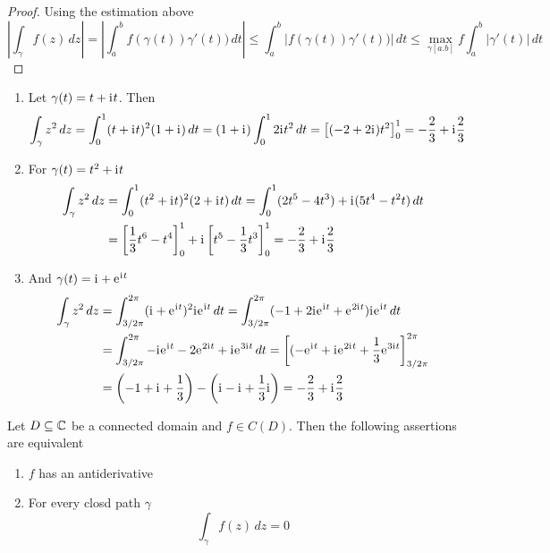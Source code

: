 \begin{definition}
\begin{proof} Using the estimation above
	\[
		\left| \int_{\gamma} f(z)\,dz \right|
			  = \left| \int_a^b f(\gamma(t))\gamma'(t))\,dt \right|
			  \le \int_a^b |f(\gamma(t))\gamma'(t))|\,dt 
			  \le  \max_{\gamma[a.b]}f \int_a^b |\gamma'(t)|\,dt 
	\]
\end{proof}
\bigskip


\begin{examples}\hfill
    \begin{enumerate}
        \item Let \( \gamma(t) = t + \mathrm{i}\mkern1mu t \). Then
			\[
				\int_{\gamma} z^2\,dz
					= \int_0^1 (t + \mathrm{i}\mkern1mu t)^2(1 + \mathrm{i}\mkern1mu)\,dt
					= (1 + \mathrm{i}\mkern1mu)\int_0^1 2\mathrm{i}\mkern1mu t^2\,dt 
					= \left[ (-2 + 2\mathrm{i}\mkern1mu) t^2 \right]_0^1 
					= -\frac{2}{3} + \mathrm{i}\mkern1mu \frac{2}{3}
			\]
		\item For \( \gamma(t) = t^2 + \mathrm{i}\mkern1mu t \) 
			\[
				\begin{split}
					\int_\gamma z^2\,dz
						& = \int_0^1 (t^2 + \mathrm{i}\mkern1mu t)^2(2 + \mathrm{i}\mkern1mu t)\,dt
							= \int_0^1 (2t^5 -  4t^3) + \mathrm{i}\mkern1mu(5t^4 - t^2t)\,dt \\
						& = \left[ \frac{1}{3} t^6 - t^4 \right]_0^1 + 
								\mathrm{i}\mkern1mu\left[ t^5 - \frac{1}{3}t^3 \right]_0^1
						  = -\frac{2}{3} + \mathrm{i}\mkern1mu \frac{2}{3}
				\end{split}
			\]
		\item And \( \gamma(t) = \mathrm{i}\mkern1mu + \mathrm{e}\mkern1mu^{\mathrm{i}\mkern1mu t} \)
			\[
				\begin{split}
					\int_\gamma z^2\,dz
						& = \int_{3/2\pi}^{2\pi} (\mathrm{i}\mkern1mu + \mathrm{e}\mkern1mu^{\mathrm{i}\mkern1mu t})^2\mathrm{i}\mkern1mu\mathrm{e}\mkern1mu^{\mathrm{i}\mkern1mu t}\,dt
							= \int_{3/2\pi}^{2\pi} (-1 + 2\mathrm{i}\mkern1mu\mathrm{e}\mkern1mu^{\mathrm{i}\mkern1mu t} + \mathrm{e}\mkern1mu^{2\mathrm{i}\mkern1mu t})\mathrm{i}\mkern1mu\mathrm{e}\mkern1mu^{\mathrm{i}\mkern1mu t}\,dt \\
						& = \int_{3/2\pi}^{2\pi} -\mathrm{i}\mkern1mu\mathrm{e}\mkern1mu^{\mathrm{i}\mkern1mu t} - 2\mathrm{e}\mkern1mu^{2\mathrm{i}\mkern1mu t} + \mathrm{i}\mkern1mu\mathrm{e}\mkern1mu^{3\mathrm{i}\mkern1mu t}\,dt
							= \left[(-\mathrm{e}\mkern1mu^{\mathrm{i}\mkern1mu t} + \mathrm{i}\mkern1mu\mathrm{e}\mkern1mu^{2\mathrm{i}\mkern1mu t} + \frac{1}{3}\mathrm{e}\mkern1mu^{3\mathrm{i}\mkern1mu t}\right]_{3/2\pi}^{2\pi} \\
						& = \left( -1 + \mathrm{i}\mkern1mu + \frac{1}{3} \right) - \left( \mathrm{i}\mkern1mu - \mathrm{i}\mkern1mu + \frac{1}{3}\mathrm{i}\mkern1mu \right)
							= -\frac{2}{3} + \mathrm{i}\mkern1mu \frac{2}{3}
				\end{split}
			\]
    \end{enumerate}
\end{examples}
\bigskip


\begin{theorem}\label{thm:thm_antiderivative}
Let \( D \subseteq \mathbb{C} \) be a connected domain and \( f \in C(D)\). Then the following assertions are equivalent
\begin{enumerate}
	\item \( f \) has an antiderivative
	\item For every closd path \( \gamma \)
		\[
			\int_{\gamma} f(z)\,dz = 0
		\]
\end{enumerate}
\end{theorem}


\end{definition}
